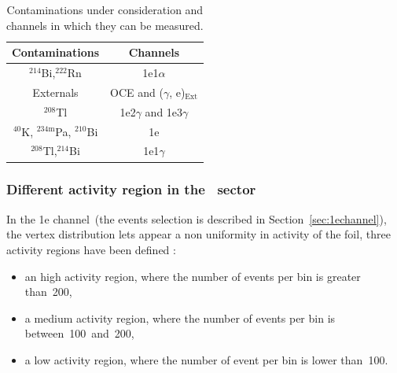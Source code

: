 \documentclass[main.tex]{subfiles}
\begin{document}
\begin{table}[h!]
\centering
\begin{tabular}{c|c}
\toprule
Contaminations & Channels \\[0.1cm]
\hline
$^{\text{214}}$Bi,$^{\text{222}}$Rn                    & 1e1$\alpha$                           \\[0.1cm]  
Externals                                              & OCE and ($\gamma$, e)$_{\text{Ext}}$  \\[0.1cm]
$^{\text{208}}$Tl                                      & 1e2$\gamma$  and 1e3$\gamma$          \\[0.1cm]
$^{\text{40}}$K, $^{\text{234m}}$Pa, $^{\text{210}}$Bi & 1e                                    \\[0.1cm]
$^{\text{208}}$Tl,$^{\text{214}}$Bi                    & 1e1$\gamma$                           \\[0.1cm] 
\bottomrule
\end{tabular}
\caption{Contaminations under consideration and channels in which they can be measured.}
\label{TableChannelBKG}
\end{table}


\bigskip


\subsubsection{Different activity region in the \Cd~sector}

\NI In the 1e channel~(the events
 selection is described in Section~\ref{sec:1echannel}), the vertex distribution lets appear a non uniformity in activity of the foil, three activity regions have been defined : 


\begin{itemize}
\item an high activity region, where the number of events per bin is greater than~200,
\item a medium activity region, where the number of events per bin is between~100~and~200,
\item a low activity region, where the number of event per bin is lower than~100.

\end{itemize}
\end{document}
